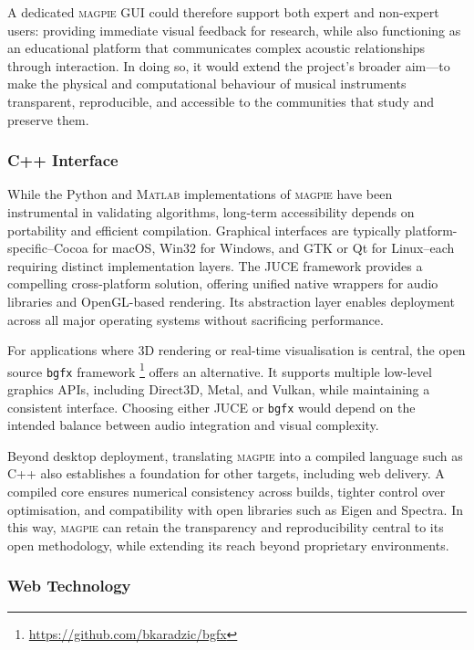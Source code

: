 A dedicated \textsc{magpie} GUI could therefore support both expert and non-expert users: providing immediate visual feedback for research, while also functioning as an educational platform that communicates complex acoustic relationships through interaction. In doing so, it would extend the project’s broader aim—to make the physical and computational behaviour of musical instruments transparent, reproducible, and accessible to the communities that study and preserve them.


\subsubsection{C++ Interface}

While the Python and M\textsc{atlab} implementations of \textsc{magpie} have been instrumental in validating algorithms, long-term accessibility depends on portability and efficient compilation. Graphical interfaces are typically platform-specific--Cocoa for macOS, Win32 for Windows, and GTK or Qt for Linux--each requiring distinct implementation layers. The JUCE framework provides a compelling cross-platform solution, offering unified native wrappers for audio libraries and OpenGL-based rendering. Its abstraction layer enables deployment across all major operating systems without sacrificing performance.  

For applications where 3D rendering or real-time visualisation is central, the open source \texttt{bgfx} framework%
\footnote{\url{https://github.com/bkaradzic/bgfx}} offers an alternative. It supports multiple low-level graphics APIs, including Direct3D, Metal, and Vulkan, while maintaining a consistent interface. Choosing either JUCE or \texttt{bgfx} would depend on the intended balance between audio integration and visual complexity.  

Beyond desktop deployment, translating \textsc{magpie} into a compiled language such as \textsc{C++} also establishes a foundation for other targets, including web delivery. A compiled core ensures numerical consistency across builds, tighter control over optimisation, and compatibility with open libraries such as Eigen and Spectra. In this way, \textsc{magpie} can retain the transparency and reproducibility central to its open methodology, while extending its reach beyond proprietary environments.

\subsubsection{Web Technology}\label{sec:wasm}

